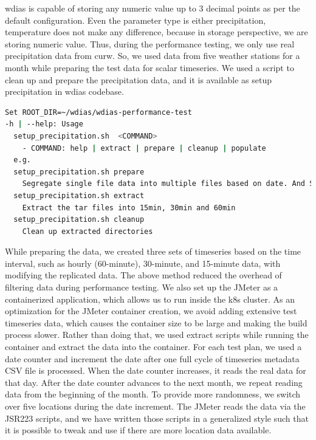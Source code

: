 \acrshort{wdias} is capable of storing any numeric value up to 3 decimal points as per the default configuration. Even the parameter type is either precipitation, temperature does not make any difference, because in storage perspective, we are storing numeric value. Thus, during the performance testing, we only use real precipitation data from \acrshort{curw}. So, we used data from five weather stations for a month while preparing the test data for scalar timeseries. We used a script to clean up and prepare the precipitation data, and it is available as setup precipitation in \acrshort{wdias} codebase.

\begin{minipage}{\linewidth}
\begin{lstlisting}[language=sh, caption=Preparation of precipitation data.]
Set ROOT_DIR=~/wdias/wdias-performance-test
-h | --help: Usage
  setup_precipitation.sh  <COMMAND>
    - COMMAND: help | extract | prepare | cleanup | populate
  e.g.
  setup_precipitation.sh prepare
    Segregate single file data into multiple files based on date. And Separate into main directories of 15min, 30min, 60min and create tar files
  setup_precipitation.sh extract
    Extract the tar files into 15min, 30min and 60min
  setup_precipitation.sh cleanup
    Clean up extracted directories
\end{lstlisting}
\end{minipage}

While preparing the data, we created three sets of timeseries based on the time interval, such as hourly (60-minute), 30-minute, and 15-minute data, with modifying the replicated data. The above method reduced the overhead of filtering data during performance testing. We also set up the JMeter as a containerized application, which allows us to run inside the k8s cluster. As an optimization for the JMeter container creation, we avoid adding extensive test timeseries data, which causes the container size to be large and making the build process slower. Rather than doing that, we used extract scripts while running the container and extract the data into the container. For each test plan, we used a date counter and increment the date after one full cycle of timeseries metadata CSV file is processed. When the date counter increases, it reads the real data for that day. After the date counter advances to the next month, we repeat reading data from the beginning of the month. To provide more randomness, we switch over five locations during the date increment. The JMeter reads the data via the JSR223 scripts, and we have written those scripts in a generalized style such that it is possible to tweak and use if there are more location data available.


